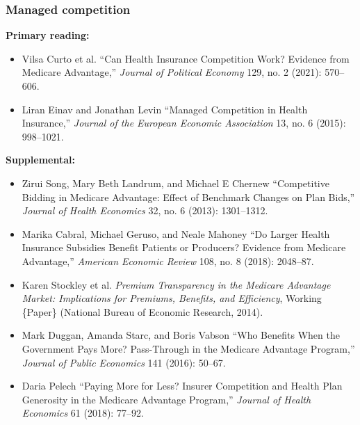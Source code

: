 \documentclass[11pt,]{article}
\providecommand{\tightlist}{%
  \setlength{\itemsep}{0pt}\setlength{\parskip}{0pt}}
\begin{document}
\hypertarget{managed-competition}{%
\subsubsection{Managed competition}\label{managed-competition}}

\textbf{Primary reading:}

\begin{itemize}
\tightlist
\item
  Vilsa Curto et al. {``Can {Health} {Insurance} {Competition} {Work}?
  {Evidence} from {Medicare} {Advantage},''} \emph{Journal of Political
  Economy} 129, no. 2 (2021): 570--606.
\item
  Liran Einav and Jonathan Levin {``Managed Competition in Health
  Insurance,''} \emph{Journal of the European Economic Association} 13,
  no. 6 (2015): 998--1021.
\end{itemize}

\textbf{Supplemental:}

\begin{itemize}
\tightlist
\item
  Zirui Song, Mary Beth Landrum, and Michael E Chernew {``Competitive
  Bidding in {Medicare} {Advantage}: {Effect} of Benchmark Changes on
  Plan Bids,''} \emph{Journal of Health Economics} 32, no. 6 (2013):
  1301--1312.
\item
  Marika Cabral, Michael Geruso, and Neale Mahoney {``Do Larger Health
  Insurance Subsidies Benefit Patients or Producers? {Evidence} from
  {Medicare} {Advantage},''} \emph{American Economic Review} 108, no. 8
  (2018): 2048--87.
\item
  Karen Stockley et al. \emph{Premium {Transparency} in the {Medicare}
  {Advantage} {Market}: {Implications} for {Premiums}, {Benefits}, and
  {Efficiency}}, Working \{Paper\} (National Bureau of Economic
  Research, 2014).
\item
  Mark Duggan, Amanda Starc, and Boris Vabson {``Who Benefits When the
  Government Pays More? {Pass}-Through in the {Medicare} {Advantage}
  Program,''} \emph{Journal of Public Economics} 141 (2016): 50--67.
\item
  Daria Pelech {``Paying More for Less? {Insurer} Competition and Health
  Plan Generosity in the {Medicare} {Advantage} Program,''}
  \emph{Journal of Health Economics} 61 (2018): 77--92.
\end{itemize}
\end{document}
